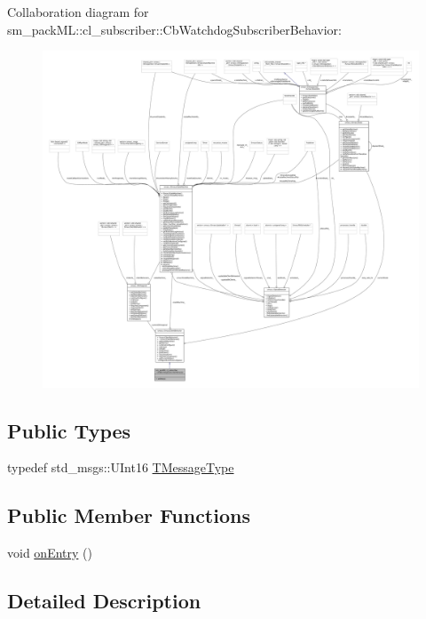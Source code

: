 Collaboration diagram for sm\+\_\+pack\+ML\+:\+:cl\+\_\+subscriber\+:\+:Cb\+Watchdog\+Subscriber\+Behavior\+:
\nopagebreak
\begin{figure}[H]
\begin{center}
\leavevmode
\includegraphics[width=350pt]{classsm__packML_1_1cl__subscriber_1_1CbWatchdogSubscriberBehavior__coll__graph}
\end{center}
\end{figure}
\subsection*{Public Types}
\begin{DoxyCompactItemize}
\item 
typedef std\+\_\+msgs\+::\+U\+Int16 \hyperlink{classsm__packML_1_1cl__subscriber_1_1CbWatchdogSubscriberBehavior_a4c2c498b391327db2667769c6de6b8da}{T\+Message\+Type}
\end{DoxyCompactItemize}
\subsection*{Public Member Functions}
\begin{DoxyCompactItemize}
\item 
void \hyperlink{classsm__packML_1_1cl__subscriber_1_1CbWatchdogSubscriberBehavior_ab6c7d5b7f24bdb3292eac8071a384ee9}{on\+Entry} ()
\end{DoxyCompactItemize}


\subsection{Detailed Description}


